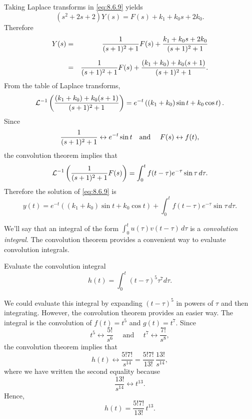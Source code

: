 \begin{examplesolution}
\solution Taking Laplace transforms in \eqref{eq:8.6.9} yields
\[
  (s^{2}+2s+2)Y(s)=F(s)+k_{1}+k_{0}s+2k_{0}.
\]
Therefore
\begin{eqnarray*}
  Y(s) & = & \frac{1}{(s+1)^{2}+1}F(s)+\frac{k_{1}+k_{0}s+2k_{0}}{(s+1)^{2}+1} \\[2\jot]
       & = & \frac{1}{(s+1)^{2}+1}F(s)+\frac{(k_{1}+k_{0})+k_{0}(s+1)}{(s+1)^{2}+1}.
\end{eqnarray*}
From the table of Laplace transforms,
\[
  {\cal L}^{-1}\left(\frac{(k_{1}+k_{0})+k_{0}(s+1)}{(s+1)^{2}+1}\right)= e^{-t}\left((k_{1}+k_{0})\sin t+k_{0}\cos t\right).
\]
Since
\[
  \frac{1}{(s+1)^{2}+1}\leftrightarrow e^{-t}\sin t\mbox{\quad and \quad}F(s)\leftrightarrow f(t),
\]
the convolution theorem implies that
\[
  {\cal L}^{-1}\left(\frac{1}{(s+1)^{2}+1}F(s)\right)= \int_{0}^{t}f(t-\tau)e^{-\tau}\sin\tau \,d\tau.
\]
Therefore the solution of \eqref{eq:8.6.9} is
\begin{equation}
  \label{eq:8.6.10}y(t)=e^{-t}\left((k_{1}+k_{0})\sin t+k_{0}\cos t\right)+\int_{0}^{t}f(t-\tau)e^{-\tau}\sin\tau\,d\tau.
\end{equation}
\end{examplesolution}


\noindent
We'll say that an integral of the form $\int_{0}^{t}u(\tau)v(t-\tau)\,d\tau$ is a {\color{blue}\it
convolution integral\/}. The convolution theorem provides a convenient way to evaluate convolution
integrals.

\begin{example}
  \label{example:8.6.5}\rm Evaluate the convolution integral
  \[
    h(t)=\int_{0}^{t}(t-\tau)^{5}\tau^{7}d\tau.
  \]
\end{example}

\begin{examplesolution}
\solution We could evaluate this integral by expanding $(t-\tau)^{5}$ in powers of $\tau$ and then
integrating. However, the convolution theorem provides an easier way. The integral is the
convolution of $f(t)=t^{5}$ and $g(t)=t^{7}$. Since
\[
  t^{5}\leftrightarrow\frac{5!}{s^{6}}\quad\mbox{ and }\quad t^{7}\leftrightarrow\frac{7!}{s^{8}},
\]
the convolution theorem implies that
\[
  h(t)\leftrightarrow\frac{5!7!}{s^{14}}=\frac{5!7!}{13!}\,\frac{13!}{s^{14}},
\]
where we have written the second equality because
\[
  \frac{13!}{s^{14}}\leftrightarrow t^{13}.
\]
Hence,
\[
  h(t)=\frac{5!7!}{13!}\,t^{13}.
\]
\end{examplesolution}

